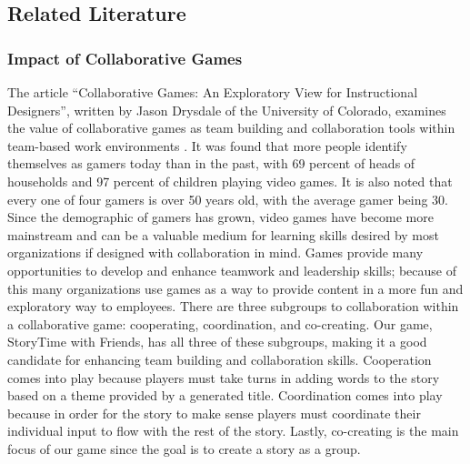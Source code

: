 \documentclass{sigchi}
\begin{document}



\subsection{Related Literature}

\subsubsection{Impact of Collaborative Games}
The article ``Collaborative Games: An Exploratory View for Instructional Designers'', written by Jason Drysdale of the University of Colorado, examines the value of collaborative games as team building and collaboration tools within team-based work environments \cite{drysdale2011collaborative}. It was found that more people identify themselves as gamers today than in the past, with 69 percent of heads of households and 97 percent of children playing video games. It is also noted that every one of four gamers is over 50 years old, with the average gamer being 30. Since the demographic of gamers has grown, video games have become more mainstream and can be a valuable medium for learning skills desired by most organizations if designed with collaboration in mind. Games provide many opportunities to develop and enhance teamwork and leadership skills; because of this many organizations use games as a way to provide content in a more fun and exploratory way to employees. There are three subgroups to collaboration within a collaborative game: cooperating, coordination, and co-creating. Our game, StoryTime with Friends, has all three of these subgroups, making it a good candidate for enhancing team building and collaboration skills. Cooperation comes into play because players must take turns in adding words to the story based on a theme provided by a generated title. Coordination comes into play because in order for the story to make sense players must coordinate their individual input to flow with the rest of the story. Lastly, co-creating is the main focus of our game since the goal is to create a story as a group.
\end{document}
